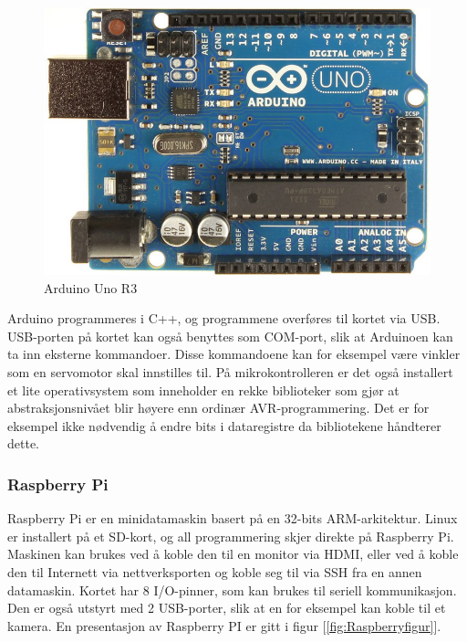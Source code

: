 \begin{figure}[h!]
\centering
\includegraphics[scale = 0.25]{img/arduinoBoard.jpg}
\caption{Arduino Uno R3 \cite{Arduino}}
\label{fig:Arduino}
\end{figure}

Arduino programmeres i C++, og programmene overføres til kortet via USB. USB-porten på kortet kan også benyttes som COM-port, slik at Arduinoen kan ta inn eksterne kommandoer. Disse kommandoene kan for eksempel være vinkler som en servomotor skal innstilles til. På mikrokontrolleren er det også installert et lite operativsystem som inneholder en rekke biblioteker som gjør at abstraksjonsnivået blir høyere enn ordinær AVR-programmering. Det er for eksempel ikke nødvendig å endre bits i dataregistre da bibliotekene håndterer dette. 

\subsubsection{Raspberry Pi}
\label{sec:Pi}
Raspberry Pi er en minidatamaskin basert på en 32-bits ARM-arkitektur. Linux er installert på et SD-kort, og all programmering skjer direkte på Raspberry Pi. Maskinen kan brukes ved å koble den til en monitor via HDMI, eller ved å koble den til Internett via nettverksporten og koble seg til via SSH fra en annen datamaskin. Kortet har 8 I/O-pinner, som kan brukes til seriell kommunikasjon. Den er også utstyrt med 2 USB-porter, slik at en for eksempel kan koble til et kamera. En presentasjon av Raspberry PI er gitt i figur [\ref{fig:Raspberryfigur}].

